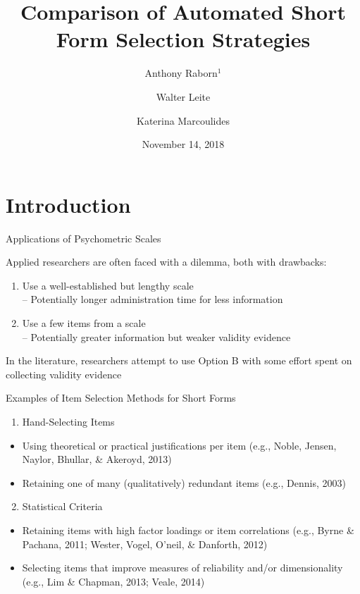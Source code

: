 \documentclass[ignorenonframetext,]{beamer}
\title{Comparison of Automated Short Form Selection Strategies}
\author{Anthony Raborn\(^1\) \and Walter Leite \and Katerina Marcoulides}
\institute{Research and Evaluation Methodology Department \and University of Florida \and 1:
\href{mailto:anthony.w.raborn@gmail.com}{\nolinkurl{anthony.w.raborn@gmail.com}}}
\date{November 14, 2018}
\providecommand{\tightlist}{%
  \setlength{\itemsep}{0pt}\setlength{\parskip}{0pt}}
\begin{document}
\frame{\titlepage}

\hypertarget{introduction}{%
\section{Introduction}\label{introduction}}

\begin{frame}{Applications of Psychometric Scales}
\protect\hypertarget{applications-of-psychometric-scales}{}

Applied researchers are often faced with a dilemma, both with drawbacks:

\begin{enumerate}[A]
  \item Use a well-established but lengthy scale \\
    -- Potentially longer administration time for less information
  \item Use a few items from a scale \\
    -- Potentially greater information but weaker validity evidence
\end{enumerate}

In the literature, researchers attempt to use Option B with some effort
spent on collecting validity evidence

\end{frame}

\begin{frame}{Examples of Item Selection Methods for Short Forms}
\protect\hypertarget{examples-of-item-selection-methods-for-short-forms}{}

\begin{enumerate}
\tightlist
\item
  Hand-Selecting Items
\end{enumerate}

\begin{itemize}
\tightlist
\item
  Using theoretical or practical justifications per item (e.g., Noble,
  Jensen, Naylor, Bhullar, \& Akeroyd, 2013)
\item
  Retaining one of many (qualitatively) redundant items (e.g., Dennis,
  2003)
\end{itemize}

\begin{enumerate}
\setcounter{enumi}{1}
\tightlist
\item
  Statistical Criteria
\end{enumerate}

\begin{itemize}
\tightlist
\item
  Retaining items with high factor loadings or item correlations (e.g.,
  Byrne \& Pachana, 2011; Wester, Vogel, O'neil, \& Danforth, 2012)
\item
  Selecting items that improve measures of reliability and/or
  dimensionality (e.g., Lim \& Chapman, 2013; Veale, 2014)
\end{itemize}

\end{frame}
\end{document}

